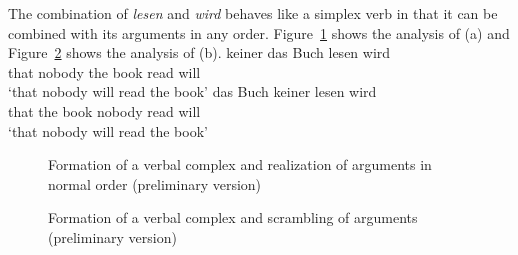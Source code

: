 The combination of \emph{lesen} and \emph{wird} behaves like a simplex verb in that it can be
combined with its arguments in any order. Figure~\ref{fig-vc-nom-acc} shows the analysis of (a) and
Figure~\ref{fig-vc-acc-nom} shows the analysis of (b).
\eal
\ex\label{ex-dass-keiner-das-buch-lesen-wird}
\gll [dass]         keiner das Buch lesen wird\\
     \spacebr{}that nobody the book read will\\
\glt `that nobody will read the book'
\ex  
\gll [dass] das Buch keiner lesen wird\\
     \spacebr{}that the book nobody read will\\
\glt `that nobody will read the book'
\zl

\begin{figure}
\caption{\label{fig-vc-nom-acc}Formation of a verbal complex and realization of arguments in normal
  order (preliminary version)}
\end{figure}




\begin{figure}
\caption{\label{fig-vc-acc-nom}Formation of a verbal complex and scrambling of arguments (preliminary version)}
\end{figure}


